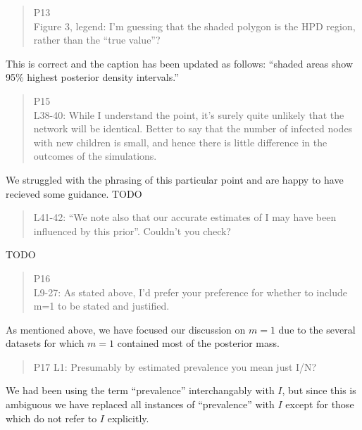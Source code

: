 \documentclass[12pt]{letter}
\begin{document}
\begin{letter}{ }
\begin{quote}
  P13 \\
  Figure 3, legend: I’m guessing that the shaded polygon is the HPD region,
  rather than the “true value”?
\end{quote}

This is correct and the caption has been updated as follows: ``shaded areas
show 95\% highest posterior density intervals.''

\begin{quote}
  \itshape

  P15 \\
  L38-40: While I understand the point, it’s surely quite unlikely that the
  network will be identical. Better to say that the number of infected nodes
  with new children is small, and hence there is little difference in the
  outcomes of the simulations.
\end{quote}

We struggled with the phrasing of this particular point and are happy to have
recieved some guidance. TODO

\begin{quote}
  \itshape

  L41-42: “We note also that our accurate estimates of I may have been
  influenced by this prior”. Couldn’t you check?
\end{quote}

TODO

\begin{quote}
  \itshape

  P16 \\
  L9-27: As stated above, I'd prefer your preference for whether to include m=1
  to be stated and justified.
\end{quote}

As mentioned above, we have focused our discussion on $m = 1$ due to the
several datasets for which $m = 1$ contained most of the posterior mass.


\begin{quote}
  \itshape

  P17
  L1: Presumably by estimated prevalence you mean just I/N?
\end{quote}

We had been using the term ``prevalence'' interchangably with $I$, but since
this is ambiguous we have replaced all instances of ``prevalence'' with $I$
except for those which do not refer to $I$ explicitly.

\begin{quote}
  \itshape


\end{quote}
\end{letter}
\end{document}
